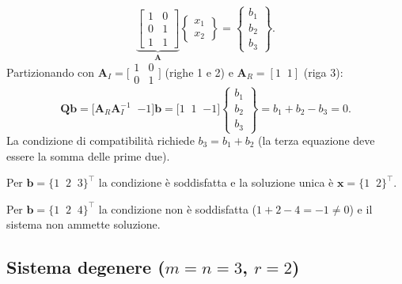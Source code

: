\begin{equation}
	\underbrace{\left[\begin{array}{cc} 1 & 0 \\ 0 & 1 \\ 1 & 1 \end{array}\right]}_{\bm{A}}
	\begin{Bmatrix} x_1 \\ x_2 \end{Bmatrix}
	= \begin{Bmatrix} b_1 \\ b_2 \\ b_3 \end{Bmatrix}.
\end{equation}
Partizionando con $\bm{A}_I=\bigl[\begin{smallmatrix}1 & 0\\ 0 & 1\end{smallmatrix}\bigr]$ (righe 1 e 2) e $\bm{A}_R=[1\;\;1]$ (riga 3):
\begin{equation}
	\bm{Q}\bm{b}
	= \bigl[\bm{A}_R\bm{A}_I^{-1}\;\;{-1}\bigr]\bm{b}
	= \bigl[1\;\;1\;\;{-1}\bigr]
	\begin{Bmatrix} b_1 \\ b_2 \\ b_3 \end{Bmatrix}
	= b_1 + b_2 - b_3 = 0.
\end{equation}
La condizione di compatibilit\`a richiede $b_3 = b_1 + b_2$ (la terza equazione deve essere la somma delle prime due).

Per $\bm{b}=\{1\;\;2\;\;3\}^\top$ la condizione  \`e soddisfatta e la soluzione unica \`e $\bm{x}=\{1\;\;2\}^\top$.

Per $\bm{b}=\{1\;\;2\;\;4\}^\top$ la condizione non \`e soddisfatta ($1+2-4=-1\neq 0$) e il sistema non ammette soluzione.


\subsection{Sistema degenere (\texorpdfstring{$m=n=3$, $r=2$}{m=n=3, r=2})}

